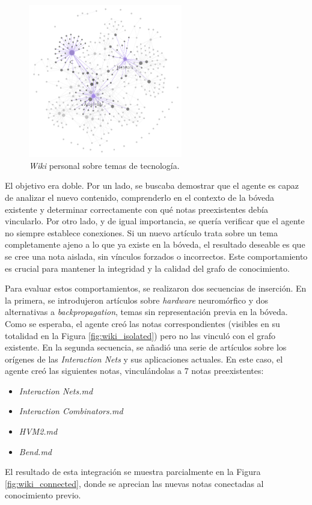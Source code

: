 \begin{figure}[h!]
    \centering
    \includegraphics[width=0.6\textwidth]{figures/WikiSamples2.png}
    \caption{\textit{Wiki} personal sobre temas de tecnología.}
    \label{fig:wiki_tech_graph}
\end{figure}

El objetivo era doble. Por un lado, se buscaba demostrar que el agente es capaz de analizar el nuevo contenido, comprenderlo en el contexto de la bóveda existente y determinar correctamente con qué notas preexistentes debía vincularlo. Por otro lado, y de igual importancia, se quería verificar que el agente no siempre establece conexiones. Si un nuevo artículo trata sobre un tema completamente ajeno a lo que ya existe en la bóveda, el resultado deseable es que se cree una nota aislada, sin vínculos forzados o incorrectos. Este comportamiento es crucial para mantener la integridad y la calidad del grafo de conocimiento.

\newpage

Para evaluar estos comportamientos, se realizaron dos secuencias de inserción. En la primera, se introdujeron artículos sobre \textit{hardware} neuromórfico y dos alternativas a \textit{backpropagation}, temas sin representación previa en la bóveda. Como se esperaba, el agente creó las notas correspondientes (visibles en su totalidad en la Figura \ref{fig:wiki_isolated}) pero no las vinculó con el grafo existente. En la segunda secuencia, se añadió una serie de artículos sobre los orígenes de las \textit{Interaction Nets} y sus aplicaciones actuales. En este caso, el agente creó las siguientes notas, vinculándolas a 7 notas preexistentes:
\begin{itemize}
    \item \textit{Interaction Nets.md}
    \item \textit{Interaction Combinators.md}
    \item \textit{HVM2.md}
    \item \textit{Bend.md}
\end{itemize}
El resultado de esta integración se muestra parcialmente en la Figura \ref{fig:wiki_connected}, donde se aprecian las nuevas notas conectadas al conocimiento previo.

